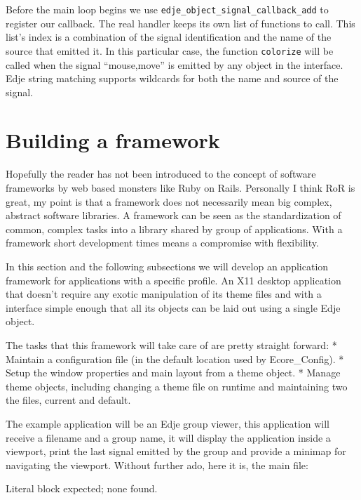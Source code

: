 \documentclass[12pt,a4paper,english]{book}
\begin{document}
Before the main loop begins we use \texttt{edje{\_}object{\_}signal{\_}callback{\_}add} to
register our callback. The real handler keeps its own list of functions to call.
This list's index is a combination of the signal identification and the name of
the source that emitted it. In this particular case, the function \texttt{colorize}
will be called when the signal ``mouse,move'' is emitted by any object in the
interface. Edje string matching supports wildcards for both the name and source
of the signal.



\hypertarget{building-a-framework}{}
\section{Building a framework}
\label{building-a-framework}

Hopefully the reader has not been introduced to the concept of software
frameworks by web based monsters like Ruby on Rails. Personally I think RoR is
great, my point is that a framework does not necessarily mean big complex,
abstract software libraries. A framework can be seen as the standardization of
common, complex tasks into a library shared by group of applications. With a
framework short development times means a compromise with flexibility.

In this section and the following subsections we will develop an application
framework for applications with a specific profile. An X11 desktop application
that doesn't require any exotic manipulation of its theme files and with a
interface simple enough that all its objects can be laid out using a single
Edje object.

The tasks that this framework will take care of are pretty straight forward:
* Maintain a configuration file (in the default location used by Ecore{\_}Config).
* Setup the window properties and main layout from a theme object.
* Manage theme objects, including changing a theme file on runtime and
maintaining two the files, current and default.

The example application will be an Edje group viewer, this application will
receive a filename and a group name, it will display the application inside a
viewport, print the last signal emitted by the group and provide a minimap for
navigating the viewport. Without further ado, here it is, the main file:

Literal block expected; none found.
\end{document}
